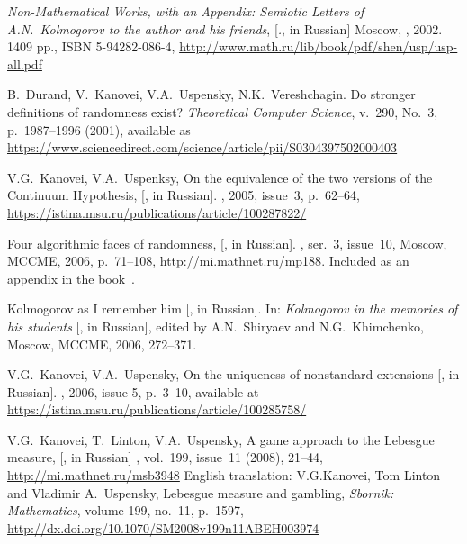 \documentclass[12pt]{article}
\theoremstyle{remark}
\newcommand{\nb}[1]{{\color{red}}}
\newcommand*{\gl}{\nobreak\hskip1pt}
\DeclareRobustCommand*{\dash}{\gl\hbox{-}\gl}
\begin{document}
\begin{thebibliography}{99}
\nb{file and TeX source of a preliminary version}

\emph{Non-Mathematical Works, with an Appendix: Semiotic Letters of A.N.~Kolmogorov to the author and his friends}, [\emph{.}, in Russian] Moscow, , 2002. 1409 pp.,  ISBN 5-94282-086-4, \url{http://www.math.ru/lib/book/pdf/shen/usp/usp-all.pdf}

B.~Durand, V.~Kanovei, V.A.~Uspensky, N.K.~Vereshchagin. Do stronger definitions of randomness exist? \emph{Theoretical Computer Science}, v.~290, No.~3, p.~1987--1996 (2001), available as \url{https://www.sciencedirect.com/science/article/pii/S0304397502000403} 

V.G.~Kanovei, V.A.~Uspenksy, On the equivalence of the two versions of the Continuum Hypothesis, [\rus{Об эквивалентности двух форм континуум\dash гипотезы}, in Russian]. \emph{}, 2005, issue~3, p.~62--64, \url{https://istina.msu.ru/publications/article/100287822/} 

\nb{page photos exist}

Four algorithmic faces of randomness, [, in Russian]. \emph{}, ser.~3, issue~10, Moscow, MCCME, 2006, p.~71--108, \url{http://mi.mathnet.ru/mp188}. Included as an appendix in the book~\cite{2013}.

Kolmogorov as I remember him
[, in Russian]. In: \emph{Kolmogorov in the memories of his students} [\emph{}, in Russian], edited by A.N.~Shiryaev and N.G.~Khimchenko, Moscow, MCCME, 2006, 272--371.

V.G.~Kanovei, V.A.~Uspensky, On the uniqueness of nonstandard extensions [, in Russian]. \emph{}, 2006, issue 5, p.~3--10, available at \url{https://istina.msu.ru/publications/article/100285758/}

V.G.~Kanovei, T.~Linton, V.A.~Uspensky, A game approach to the Lebesgue measure, [, in Russian] \emph{}, vol.~199, issue~11 (2008), 21--44, \url{http://mi.mathnet.ru/msb3948} English translation: V.G.Kanovei, Tom Linton and Vladimir A.~Uspensky, Lebesgue measure and gambling, \emph{Sbornik: Mathematics}, volume 199, no.~11, p.~1597, \url{http://dx.doi.org/10.1070/SM2008v199n11ABEH003974}


\end{thebibliography}
\end{document}
